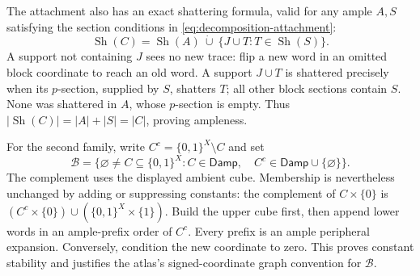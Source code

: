 \documentclass[11pt]{article}
\theoremstyle{definition}
\newcommand{\bits}{\{0,1\}}
\newcommand{\Damp}{\mathsf{Damp}}
\newcommand{\Sh}{\operatorname{Sh}}
\begin{document}
The attachment also has an exact shattering formula, valid for any ample
$A,S$ satisfying the section conditions in \eqref{eq:decomposition-attachment}:
\begin{equation}\label{eq:attachment-shattering}
 \Sh(C)=\Sh(A)\ \dot\cup\ \{J\cup T:T\in\Sh(S)\}.
\end{equation}
A support not containing $J$ sees no new trace: flip a new word in an
omitted block coordinate to reach an old word. A support $J\cup T$ is
shattered precisely when its $p$-section, supplied by $S$, shatters $T$;
all other block sections contain $S$. None was shattered in $A$, whose
$p$-section is empty. Thus $|\Sh(C)|=|A|+|S|=|C|$, proving ampleness.

For the second family, write $C^c=\bits^X\setminus C$ and set
\begin{equation}\label{eq:both-dismantlable}
 \mathcal B=\{\varnothing\ne C\subseteq\bits^X:
 C\in\Damp,\quad C^c\in\Damp\cup\{\varnothing\}\}.
\end{equation}
The complement uses the displayed ambient cube. Membership is nevertheless
unchanged by adding or suppressing constants: the complement of
$C\times\{0\}$ is $(C^c\times\{0\})\cup(\bits^X\times\{1\})$.
Build the upper cube first, then append lower words in an ample-prefix
order of $C^c$. Every prefix is an ample peripheral expansion. Conversely,
condition the new coordinate to zero. This proves constant stability and
justifies the atlas's signed-coordinate graph convention for $\mathcal B$.
\end{document}
